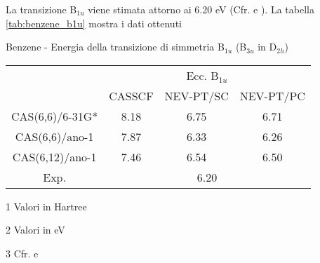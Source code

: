 La transizione B$_{1u}$ viene stimata attorno ai 6.20 eV (Cfr.
\cite{jcp-112-6-2000-2798} e \cite{tca-91-1995-91}). La tabella
\ref{tab:benzene_b1u} mostra i dati ottenuti
\begin{center}
\begin{threeparttable}
\caption{\small Benzene - Energia della transizione di simmetria B$_{1u}$
(B$_{3u}$ in D$_{2h}$)}
\label{tab:benzene_b1u}
{
\small
\begin{tabular}{|c|ccc|}
\hline
 				& \multicolumn{3}{c|}{ Ecc. B$_{1u}$\tnote{2}} \\
				& CASSCF		& NEV-PT/SC & NEV-PT/PC \\
\hline
CAS(6,6)/6-31G*	&  8.18			& 6.75		& 6.71		\\
CAS(6,6)/ano-1	&  7.87			& 6.33 		& 6.26		\\
CAS(6,12)/ano-1	&  7.46			& 6.54		& 6.50		\\
\hline
\hline
Exp.\tnote{3}	&	 \multicolumn{3}{c|}{6.20} \\
\hline
\end{tabular}
}
\begin{tablenotes}
\small
 \item[1] Valori in Hartree
 \item[2] Valori in eV
 \item[3] Cfr. \cite{jcp-112-6-2000-2798} e \cite{tca-91-1995-91}
\end{tablenotes}
\end{threeparttable}
\end{center}
